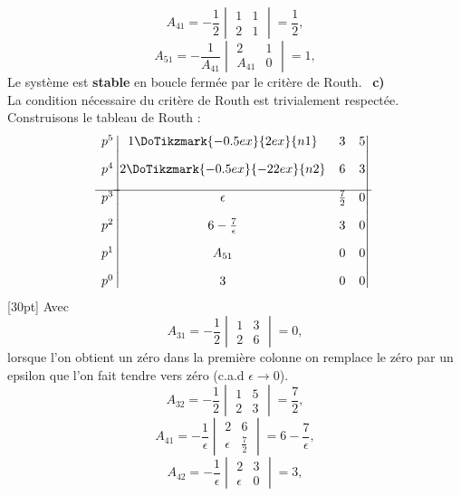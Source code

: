 \[
A_{41}=-\dfrac{1}{2}\begin{vmatrix}1 & 1 \\2&1\end{vmatrix}=\dfrac{1}{2},
\]
\[
A_{51}=-\dfrac{1}{A_{41}}\begin{vmatrix}2 & 1 \\A_{41}&0\end{vmatrix}=1,
\]
Le système est \textbf{stable} en boucle fermée par le critère de Routh.
\noindent~\textbf{c)}\\
La condition nécessaire du critère de Routh est trivialement respectée.
Construisons le tableau de Routh :
\[
\begin{matrix}
    p^5 \\[1em]
    p^4 \\[1em]
    \hline
    p^3 \\[1em]
    p^2 \\[1em]
    p^1 \\[1em]
    p^0 
\end{matrix}
\begin{vmatrix}
    1\DoTikzmark{-0.5ex}{2ex}{n1}      & 3   & 5 \\[1em]
    2\DoTikzmark{-0.5ex}{-22ex}{n2}      & 6   & 3 \\[1em]
    \hline
    \epsilon   & \frac{7}{2} & 0 \\[1em]
    6-\frac{7}{\epsilon}    & 3  & 0 \\[1em]
    A_{51} & 0  &  0 \\[1em]
    3            & 0  &  0 
\end{vmatrix}
\]
[30pt]
Avec
\[
A_{31}=-\dfrac{1}{2}\begin{vmatrix}1 & 3 \\2&6\end{vmatrix}=0,
\]
lorsque l'on obtient un zéro dans la première colonne on remplace le zéro 
par un epsilon que l'on fait tendre vers zéro (c.a.d $\epsilon\rightarrow0$).
\[
A_{32}=-\dfrac{1}{2}\begin{vmatrix}1 & 5 \\2&3\end{vmatrix}=\dfrac{7}{2},
\]
\[
A_{41}=-\dfrac{1}{\epsilon}
       \begin{vmatrix}
           2 & 6 \\
           \epsilon&\frac{7}{2}
       \end{vmatrix}
      =6-\frac{7}{\epsilon},
\]
\[
A_{42}=-\dfrac{1}{\epsilon}\begin{vmatrix}2 & 3 \\\epsilon&0\end{vmatrix}=3,
\]
